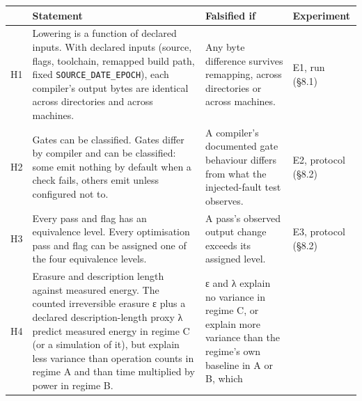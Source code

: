 \documentclass[10pt,letterpaper]{article}
\begin{document}
{\footnotesize\setlength{\tabcolsep}{3.8pt}\renewcommand{\arraystretch}{1.15}
\begin{longtable}[]{@{}
  >{\raggedright\arraybackslash}p{}
  >{\raggedright\arraybackslash}p{}
  >{\raggedright\arraybackslash}p{}
  >{\raggedright\arraybackslash}p{}@{}}
\toprule\noalign{}
\begin{minipage}[b]{\linewidth}\raggedright
\end{minipage} & \begin{minipage}[b]{\linewidth}\raggedright
\textbf{Statement}
\end{minipage} & \begin{minipage}[b]{\linewidth}\raggedright
\textbf{Falsified if}
\end{minipage} & \begin{minipage}[b]{\linewidth}\raggedright
\textbf{Experiment}
\end{minipage} \\
\midrule\noalign{}
\endhead
\bottomrule\noalign{}
\endlastfoot
H1 & Lowering is a function of declared inputs. With declared inputs
(source, flags, toolchain, remapped build path, fixed
\texttt{SOURCE\_\allowbreak{}DATE\_\allowbreak{}EPOCH}), each compiler's output bytes are
identical across directories and across machines. & Any byte difference
survives remapping, across directories or across machines. & E1, run
(§8.1) \\
H2 & Gates can be classified. Gates differ by compiler and can be
classified: some emit nothing by default when a check fails, others emit
unless configured not to. & A compiler's documented gate behaviour
differs from what the injected-fault test observes. & E2, protocol
(§8.2) \\
H3 & Every pass and flag has an equivalence level. Every optimisation
pass and flag can be assigned one of the four equivalence levels. & A
pass's observed output change exceeds its assigned level. & E3, protocol
(§8.2) \\
H4 & Erasure and description length against measured energy. The counted
irreversible erasure ε plus a declared description-length proxy λ
predict measured energy in regime C (or a simulation of it), but explain
less variance than operation counts in regime A and than time multiplied
by power in regime B. & ε and λ explain no variance in regime C, or
explain more variance than the regime's own baseline in A or B, which

\end{longtable}}
\end{document}
